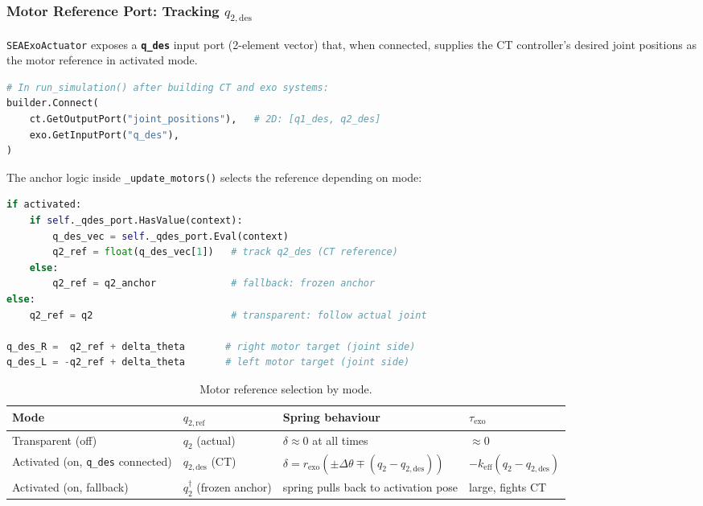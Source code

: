 \documentclass[11pt,a4paper]{article}
\begin{document}
\subsubsection{Motor Reference Port: Tracking $q_{2,\mathrm{des}}$}
\label{sec:exo_qdes}

\texttt{SEAExoActuator} exposes a \textbf{\texttt{q\_des}} input port (2-element
vector) that, when connected, supplies the CT controller's desired joint
positions as the motor reference in activated mode.

\begin{lstlisting}[language=Python, style=python,
    caption={Drake diagram wiring: CT desired positions to exosuit reference.}]
# In run_simulation() after building CT and exo systems:
builder.Connect(
    ct.GetOutputPort("joint_positions"),   # 2D: [q1_des, q2_des]
    exo.GetInputPort("q_des"),
)
\end{lstlisting}

The anchor logic inside \texttt{\_update\_motors()} selects the reference
depending on mode:
\begin{lstlisting}[language=Python, style=python,
    caption={Reference selection in \texttt{SEAExoActuator.\_update\_motors()}.}]
if activated:
    if self._qdes_port.HasValue(context):
        q_des_vec = self._qdes_port.Eval(context)
        q2_ref = float(q_des_vec[1])   # track q2_des (CT reference)
    else:
        q2_ref = q2_anchor             # fallback: frozen anchor
else:
    q2_ref = q2                        # transparent: follow actual joint

q_des_R =  q2_ref + delta_theta       # right motor target (joint side)
q_des_L = -q2_ref + delta_theta       # left motor target (joint side)
\end{lstlisting}

\begin{table}[H]
\centering
\caption{Motor reference selection by mode.}
\begin{tabular}{llll}
\toprule
\textbf{Mode} & \textbf{$q_{2,\mathrm{ref}}$} & \textbf{Spring behaviour} & \textbf{$\tau_{\mathrm{exo}}$} \\
\midrule
Transparent (off) & $q_2$ (actual) & $\delta \approx 0$ at all times & $\approx 0$ \\
Activated (on, \texttt{q\_des} connected) & $q_{2,\mathrm{des}}$ (CT) & $\delta = r_{\mathrm{exo}}(\pm\Delta\theta \mp (q_2-q_{2,\mathrm{des}}))$ & $-k_{\mathrm{eff}}(q_2 - q_{2,\mathrm{des}})$ \\
Activated (on, fallback) & $q_2^{\dagger}$ (frozen anchor) & spring pulls back to activation pose & large, fights CT \\
\bottomrule
\end{tabular}
\end{table}
\end{document}

